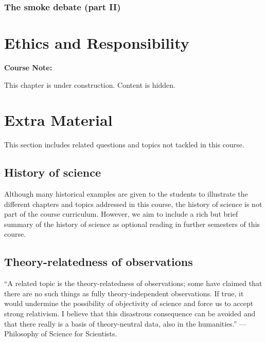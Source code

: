 \documentclass[
]{book}
\begin{document}
\hypertarget{the-smoke-debate-part-ii}{%
\subsection{The smoke debate (part II)}\label{the-smoke-debate-part-ii}}

\hypertarget{ethics-and-responsibility}{%
\chapter{Ethics and Responsibility}\label{ethics-and-responsibility}}

\begin{notebox}

\begin{center}
\textbf{Course Note:}

\end{center}

This chapter is under construction. Content is hidden.

\end{notebox}

\hypertarget{wont-fix}{%
\chapter{Extra Material}\label{wont-fix}}

This section includes related questions and topics not tackled in this course.

\hypertarget{history-of-science}{%
\section{History of science}\label{history-of-science}}

Although many historical examples are given to the students to illustrate the different chapters and topics addressed in this course, the history of science is not part of the course curriculum. However, we aim to include a rich but brief summary of the history of science as optional reading in further semesters of this course.

\hypertarget{theory-relatedness-of-observations}{%
\section{Theory-relatedness of observations}\label{theory-relatedness-of-observations}}

``A related topic is the theory-relatedness of observations; some have claimed that there are no such things as fully theory-independent observations. If true, it would undermine the possibility of objectivity of science and force us to accept strong relativism. I believe that this disastrous consequence can be avoided and that there really is a basis of theory-neutral data, also in the humanities.'' --- Philosophy of Science for Scientists.
\end{document}

